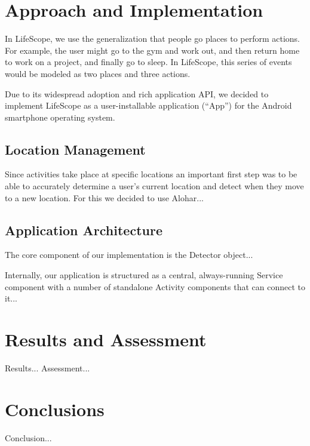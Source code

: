 \documentclass{acm_proc_article-sp}
\begin{document}

\section{Approach and Implementation}
In LifeScope, we use the generalization that people go places to perform actions. For example, the user might go to the gym and work out, and then return home to work on a project, and finally go to sleep.  In LifeScope, this series of events would be modeled as two places and three actions. 

Due to its widespread adoption and rich application API, we decided to implement LifeScope as a user-installable application (``App'') for the Android smartphone operating system.

\subsection {Location Management}
Since activities take place at specific locations an important first step was to be able to accurately determine a user's current location and detect when they move to a new location. For this we decided to use Alohar...

\subsection {Application Architecture}
The core component of our implementation is the Detector object...

Internally, our application is structured as a central, always-running Service component with a number of standalone Activity components that can connect to it...


\section{Results and Assessment}
Results...
Assessment...


\section{Conclusions}
Conclusion...




\end{document}
